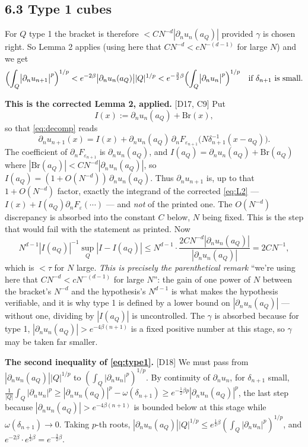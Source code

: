 \documentclass[11pt,reqno]{amsart}
\theoremstyle{plain}
\theoremstyle{definition}
\theoremstyle{plain}
\theoremstyle{definition}
\theoremstyle{remark}
\newcommand{\nd}{\partial_n}
\newcommand{\Ledger}[1]{{\scriptsize\textsf{[#1]}}}
\begin{document}
\subsection*{6.3 Type 1 cubes}

For $Q$ type 1 the bracket is therefore $<CN^{-d}|\nd u_n(a_Q)|$ provided $\gamma$
is chosen right. So Lemma 2 applies (using here that $CN^{-d}<cN^{-(d-1)}$ for large
$N$) and we get
\begin{equation}\label{eq:type1}
 \Bigl(\int_Q\bigl|\nd u_{n+1}\bigr|^p\Bigr)^{1/p}
 <e^{-2\beta}\bigl|\nd u_n(a_Q)\bigr||Q|^{1/p}
 <e^{-\frac32\beta}\Bigl(\int_Q\bigl|\nd u_n\bigr|^p\Bigr)^{1/p}
 \quad\text{if }\delta_{n+1}\text{ is small.}
\end{equation}

\begin{expansion}
\textbf{This is the corrected Lemma 2, applied.} \Ledger{D17, C9} Put
\[I(x):=\nd u_n(a_Q)+\mathrm{Br}(x),\]
so that \eqref{eq:decomp} reads
\[\nd u_{n+1}(x)=I(x)+\nd u_n(a_Q)\,
   \nd F_{\varepsilon_{n+1}}\bigl(N\delta_{n+1}^{-1}(x-a_Q)\bigr).\]
The coefficient of $\nd F_{\varepsilon_{n+1}}$ is $\nd u_n(a_Q)$, and
$I(a_Q)=\nd u_n(a_Q)+\mathrm{Br}(a_Q)$ where
$|\mathrm{Br}(a_Q)|<CN^{-d}|\nd u_n(a_Q)|$, so
$I(a_Q)=(1+O(N^{-d}))\,\nd u_n(a_Q)$. Thus $\nd u_{n+1}$ is, up to that
$1+O(N^{-d})$ factor, exactly the integrand of the corrected \eqref{eq:L2} ---
$I(x)+I(a_Q)\nd F_\varepsilon(\cdots)$ --- and \emph{not} of the printed one. The
$O(N^{-d})$ discrepancy is absorbed into the constant $C$ below, $N$ being fixed.
This is the step that would fail with the statement as printed. Now
\[N^{d-1}|I(a_Q)|^{-1}\sup_Q|I-I(a_Q)|
 \le N^{d-1}\cdot\frac{2CN^{-d}|\nd u_n(a_Q)|}{|\nd u_n(a_Q)|}=2CN^{-1},\]
which is $<\tau$ for $N$ large. \emph{This is precisely the parenthetical remark}
``we're using here that $CN^{-d}<cN^{-(d-1)}$ for large $N$'': the gain of one power
of $N$ between the bracket's $N^{-d}$ and the hypothesis's $N^{d-1}$ is what makes
the hypothesis verifiable, and it is why type 1 is defined by a lower bound on
$|\nd u_n(a_Q)|$ --- without one, dividing by $|I(a_Q)|$ is uncontrolled. The $\gamma$
is absorbed because for type 1, $|\nd u_n(a_Q)|>e^{-4\beta(n+1)}$ is a fixed
positive number at this stage, so $\gamma$ may be taken far smaller.

\textbf{The second inequality of \eqref{eq:type1}.} \Ledger{D18} We must pass from
$|\nd u_n(a_Q)||Q|^{1/p}$ to $(\int_Q|\nd u_n|^p)^{1/p}$. By continuity of
$\nd u_n$, for $\delta_{n+1}$ small,
$\frac1{|Q|}\int_Q|\nd u_n|^p\ge|\nd u_n(a_Q)|^p-\omega(\delta_{n+1})
 \ge e^{-\frac12\beta p}|\nd u_n(a_Q)|^p$,
the last step because $|\nd u_n(a_Q)|>e^{-4\beta(n+1)}$ is bounded below at this
stage while $\omega(\delta_{n+1})\to0$. Taking $p$-th roots,
$|\nd u_n(a_Q)||Q|^{1/p}\le e^{\frac12\beta}(\int_Q|\nd u_n|^p)^{1/p}$, and
$e^{-2\beta}\cdot e^{\frac12\beta}=e^{-\frac32\beta}$.
\end{expansion}
\end{document}
